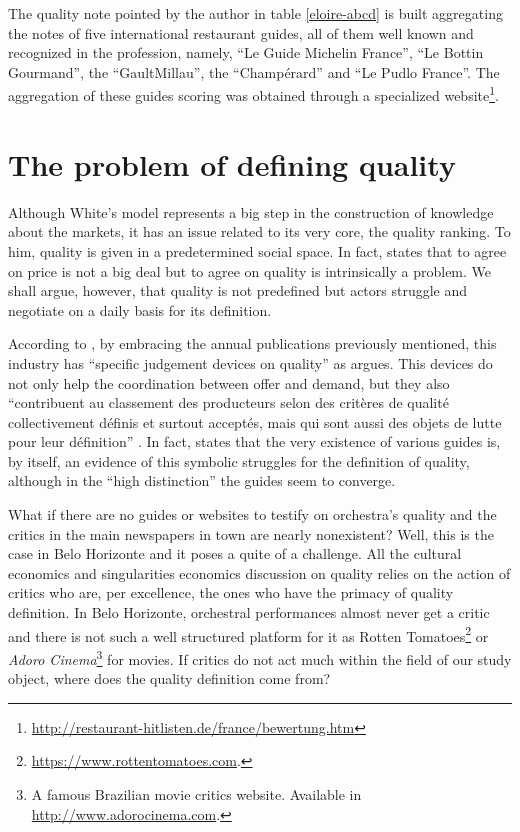 \documentclass[a4paper, 12pt, openright, oneside, german, french, brazil, english]{abntex2}
\begin{document}
        The quality note pointed by the author in table \ref{eloire-abcd} is built aggregating the notes of five international restaurant guides, all of them well known and recognized in the profession, namely, ``Le Guide Michelin France'', ``Le Bottin Gourmand'', the ``GaultMillau'', the ``Champérard'' and ``Le Pudlo France''. The aggregation of these guides scoring was obtained through a specialized website\footnote{\url{http://restaurant-hitlisten.de/france/bewertung.htm}}.
        
	
	
	
	\section{The problem of defining quality}
	
	Although White's model represents a big step in the construction of knowledge about the markets, it has an issue related to its very core, the quality ranking. To him, quality is given in a predetermined social space. In fact,  states that to agree on price is not a big deal but to agree on quality is intrinsically a problem. We shall argue, however, that quality is not predefined but actors struggle and negotiate on a daily basis for its definition.

        According to , by embracing the annual publications previously mentioned, this industry has ``specific judgement devices on quality'' as   argues. This devices do not only help the coordination between offer and demand, but they also ``contribuent au classement des producteurs selon des critères de qualité collectivement définis et surtout acceptés, mais qui sont aussi des objets de lutte pour leur définition'' \cite[p. 494]{eloire2009reseaux}. In fact,  states that the very existence of various guides is, by itself, an evidence of this symbolic struggles for the definition of quality, although in the ``high distinction'' the guides seem to converge.

        What if there are no guides or websites to testify on orchestra's quality and the critics in the main newspapers in town are nearly nonexistent? Well, this is the case in Belo Horizonte and it poses a quite of a challenge. All the cultural economics and singularities economics discussion on quality relies on the action of critics who are, per excellence, the ones who have the primacy of quality definition. In Belo Horizonte, orchestral performances almost never get a critic and there is not such a well structured platform for it as Rotten Tomatoes\footnote{\url{https://www.rottentomatoes.com}.} or \textit{Adoro Cinema}\footnote{A famous Brazilian movie critics website. Available in \url{http://www.adorocinema.com}.} for movies. If critics do not act much within the field of our study object, where does the quality definition come from?
        
\end{document}
